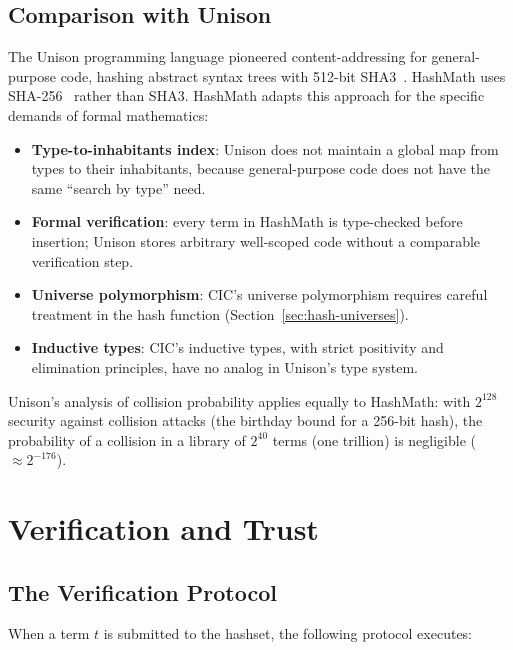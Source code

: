 \documentclass[11pt]{article}
\theoremstyle{definition}
\theoremstyle{plain}
\theoremstyle{remark}
\begin{document}
\subsection{Comparison with Unison}
\label{sec:unison}

The Unison programming language pioneered content-addressing for general-purpose code,
hashing abstract syntax trees with 512-bit SHA3~\cite{unison}.
HashMath uses SHA-256~\cite{sha256} rather than SHA3.
HashMath adapts this approach for the specific demands of formal mathematics:

\begin{itemize}[nosep]
  \item \textbf{Type-to-inhabitants index}: Unison does not maintain a global map from types
    to their inhabitants, because general-purpose code does not have the same ``search by type'' need.
  \item \textbf{Formal verification}: every term in HashMath is type-checked before insertion;
    Unison stores arbitrary well-scoped code without a comparable verification step.
  \item \textbf{Universe polymorphism}: CIC's universe polymorphism requires careful treatment
    in the hash function (Section~\ref{sec:hash-universes}).
  \item \textbf{Inductive types}: CIC's inductive types, with strict positivity and elimination principles,
    have no analog in Unison's type system.
\end{itemize}

Unison's analysis of collision probability applies equally to HashMath: with $2^{128}$
security against collision attacks (the birthday bound for a 256-bit hash), the probability of a collision in a library of $2^{40}$
terms (one trillion) is negligible ($\approx 2^{-176}$).


\section{Verification and Trust}
\label{sec:trust}

\subsection{The Verification Protocol}
\label{sec:protocol}

When a term $t$ is submitted to the hashset, the following protocol executes:
\end{document}
